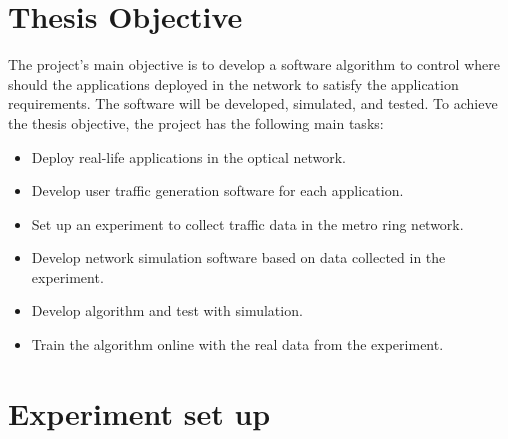 \documentclass[conference]{IEEEtran}
\begin{document}
\section{Thesis Objective}
\label{sec:Thesis Objective}
The project's main objective is to develop a software algorithm to control where should the applications deployed in the network to satisfy the application requirements. The software will be developed, simulated, and tested. To achieve the thesis objective, the project has the following main tasks:
\begin{itemize}
    \item Deploy real-life applications in the optical network.
    \item Develop user traffic generation software for each application.
    \item Set up an experiment to collect traffic data in the metro ring network.
    \item Develop network simulation software based on data collected in the experiment.
    \item Develop algorithm and test with simulation.
    \item Train the algorithm online with the real data from the experiment.
\end{itemize}








\section{Experiment set up}
\label{sec:Experiment set up}
\end{document}
